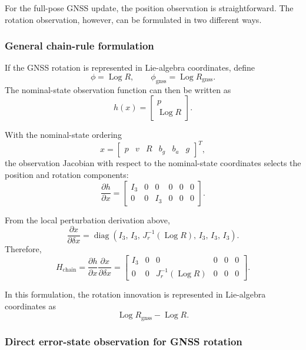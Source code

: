 \documentclass[11pt]{article}
\numberwithin{equation}{section}
\newcommand{\Log}{\operatorname{Log}}
\begin{document}
For the full-pose GNSS update, the position observation is
straightforward.  The rotation observation, however, can be formulated
in two different ways.

\subsubsection*{General chain-rule formulation}

If the GNSS rotation is represented in Lie-algebra coordinates, define
\[
\phi=\Log R,
\qquad
\phi_{\mathrm{gnss}}=\Log R_{\mathrm{gnss}}.
\]
The nominal-state observation function can then be written as
\begin{equation}
\boxed{
h(x)
=
\begin{bmatrix}
p\\
\Log R
\end{bmatrix}.
}
\end{equation}

With the nominal-state ordering
\[
x=
\begin{bmatrix}
p&v&R&b_g&b_a&g
\end{bmatrix}^{T},
\]
the observation Jacobian with respect to the nominal-state coordinates
selects the position and rotation components:
\begin{equation}
\boxed{
\frac{\partial h}{\partial x}
=
\begin{bmatrix}
I_3&0&0&0&0&0\\
0&0&I_3&0&0&0
\end{bmatrix}.
}
\end{equation}

From the local perturbation derivation above,
\[
\frac{\partial x}{\partial\delta x}
=
\operatorname{diag}
\left(
I_3,\,
I_3,\,
J_r^{-1}(\Log R),\,
I_3,\,
I_3,\,
I_3
\right).
\]
Therefore,
\begin{equation}
\boxed{
H_{\mathrm{chain}}
=
\frac{\partial h}{\partial x}
\frac{\partial x}{\partial\delta x}
=
\begin{bmatrix}
I_3&0&0&0&0&0\\
0&0&J_r^{-1}(\Log R)&0&0&0
\end{bmatrix}.
}
\end{equation}

In this formulation, the rotation innovation is represented in
Lie-algebra coordinates as
\[
\Log R_{\mathrm{gnss}}-\Log R.
\]

\subsubsection*{Direct error-state observation for GNSS rotation}
\end{document}
